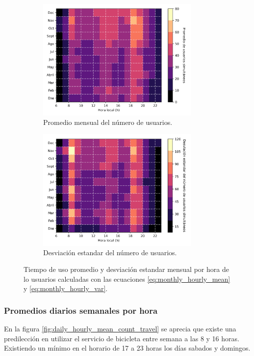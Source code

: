 \begin{figure}[H]
    \centering
    \begin{subfigure}[b]{8cm}
        \includegraphics[width=8cm]{Graphics/monthly_hourly_mean_count_travel.png}
        \caption{Promedio mensual del número de usuarios.}
        \label{fig:monthly_hourly_mean_count_travel}
    \end{subfigure}
    \begin{subfigure}[b]{8cm}
        \includegraphics[width=8cm]{Graphics/monthly_hourly_var_count_travel.png}
        \caption{Desviación estandar del número de usuarios.}
        \label{fig:monthly_hourly_var_count_travel}
    \end{subfigure}
    \caption{Tiempo de uso promedio y desviación estandar mensual por hora de lo usuarios calculadas con las ecuaciones \ref{eq:monthly_hourly_mean} y \ref{eq:monthly_hourly_var}.}
    \label{fig:monthly_hourly_count_travel}
\end{figure}

\subsubsection{Promedios diarios semanales por hora}

En la figura \ref{fig:daily_hourly_mean_count_travel} se aprecia que existe una predilección en utilizar el servicio de bicicleta entre semana a las 8 y 16 horas. Existiendo un mínimo en el horario de 17 a 23 horas los días sabados y domingos.

